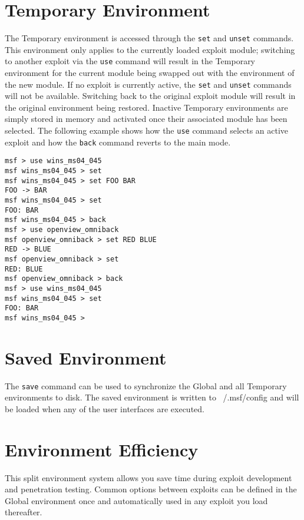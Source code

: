 \documentclass{report}
\begin{document}
    \section{Temporary Environment}
    \label{ENV-TEMP}
\par

The Temporary environment is accessed through the \texttt{set} and
\texttt{unset} commands. This environment only applies to the currently loaded
exploit module; switching to another exploit via the \texttt{use} command will
result in the Temporary environment for the current module being swapped out
with the environment of the new module. If no exploit is currently active, the
\texttt{set} and \texttt{unset} commands will not be available. Switching back
to the original exploit module will result in the original environment being
restored. Inactive Temporary environments are simply stored in memory and
activated once their associated module has been selected. The following example
shows how the \texttt{use} command selects an active exploit and how the
\texttt{back} command reverts to the main mode.  

\begin{verbatim}
msf > use wins_ms04_045
msf wins_ms04_045 > set
msf wins_ms04_045 > set FOO BAR
FOO -> BAR
msf wins_ms04_045 > set
FOO: BAR
msf wins_ms04_045 > back
msf > use openview_omniback
msf openview_omniback > set RED BLUE
RED -> BLUE
msf openview_omniback > set
RED: BLUE
msf openview_omniback > back
msf > use wins_ms04_045
msf wins_ms04_045 > set
FOO: BAR
msf wins_ms04_045 >
\end{verbatim}


    \section{Saved Environment}
    \label{ENV-SAVE}
\par
The \texttt{save} command can be used to synchronize the Global and all
Temporary environments to disk. The saved environment is written to
~/.msf/config and will be loaded when any of the user interfaces are executed.  


    \section{Environment Efficiency}
    \label{ENV-EFF}
\par
This split environment system allows you save time during exploit development
and penetration testing. Common options between exploits can be defined in the
Global environment once and automatically used in any exploit you load thereafter.  
\end{document}
